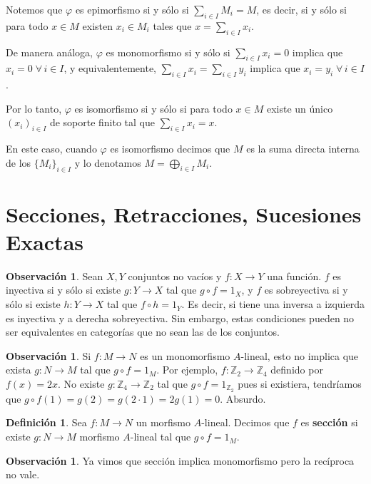 \documentclass[12pt]{book}
\theoremstyle{definition}
\newtheorem{obs}[teo]{Observación}
\newtheorem{defn}[teo]{Definición}
\newcommand{\ZZ}{\mathbb{Z}}      %
\begin{document}
Notemos que $\varphi$ es epimorfismo si y sólo si $\displaystyle\sum_{i\in I}M_i = M$, es decir, si y sólo si para todo $x\in M$ existen $x_i\in M_i$ tales que $x=\displaystyle\sum_{i\in I}x_i$. 

De manera análoga, $\varphi$ es monomorfismo si y sólo si $\displaystyle\sum_{i\in I}x_i = 0$ implica que $x_i=0 \; \forall \, i\in I$, y equivalentemente, $\displaystyle\sum_{i\in I}x_i = \displaystyle\sum_{i \in I}y_i$ implica que $x_i=y_i \;\forall\, i\in I$.

Por lo tanto, $\varphi$ es isomorfismo si y sólo si para todo $x\in M$ existe un único $(x_i)_{i\in I}$ de soporte finito tal que $\displaystyle\sum_{i\in I}x_i = x$.

En este caso, cuando $\varphi$ es isomorfismo decimos que $M$ es la suma directa interna de los $\{M_i\}_{i\in I}$ y lo denotamos $M=\displaystyle\bigoplus_{i\in I} M_i$.

\section{Secciones, Retracciones, Sucesiones Exactas}

\begin{obs}
Sean $X,Y$ conjuntos no vacíos y $f:X\to Y$ una función. $f$ es inyectiva si y sólo si existe $g:Y\to X$ tal que $g\circ f = 1_X$, y $f$ es sobreyectiva si y sólo si existe $h:Y\to X$ tal que $f\circ h = 1_Y$. Es decir, si tiene una inversa a izquierda es inyectiva y a derecha sobreyectiva. Sin embargo, estas condiciones pueden no ser equivalentes en categorías que no sean las de los conjuntos.
\end{obs}

\begin{obs}
Si $f:M\to N$ es un monomorfismo $A$-lineal, esto no implica que exista $g:N\to M$ tal que $g\circ f=1_M$. Por ejemplo, $f:\ZZ_2\to\ZZ_4$ definido por $f(x)=2x$. No existe $g:\ZZ_4\to\ZZ_2$ tal que $g\circ f=1_{\ZZ_2}$ pues si existiera, tendríamos que $g\circ f(1)=g(2)=g(2\cdot 1)=2g(1)=0$. Absurdo.
\end{obs}

\begin{defn}
Sea $f:M\to N$ un morfismo $A$-lineal. Decimos que $f$ es \textbf{sección} si existe $g:N\to M$ morfismo $A$-lineal tal que $g\circ f = 1_M$.
\end{defn}

\begin{obs}
Ya vimos que sección implica monomorfismo pero la recíproca no vale.
\end{obs}
\end{document}
